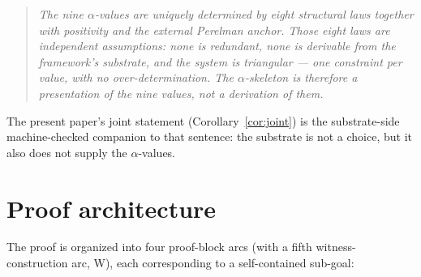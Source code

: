 \documentclass[11pt,a4paper]{article}
\theoremstyle{plain}
\theoremstyle{definition}
\begin{document}
\begin{quote}\itshape
The nine $\alpha$-values are uniquely determined by eight structural laws together with positivity and the external Perelman anchor. Those eight laws are independent assumptions: none is redundant, none is derivable from the framework's substrate, and the system is triangular --- one constraint per value, with no over-determination. The $\alpha$-skeleton is therefore a \emph{presentation} of the nine values, not a derivation of them.
\end{quote}

The present paper's joint statement (Corollary~\ref{cor:joint}) is the substrate-side machine-checked companion to that sentence: the substrate is not a choice, but it also does not supply the $\alpha$-values.

\section{Proof architecture}
\label{sec:proof}

The proof is organized into four proof-block arcs (with a fifth witness-construction arc, W), each corresponding to a self-contained sub-goal:
\end{document}
